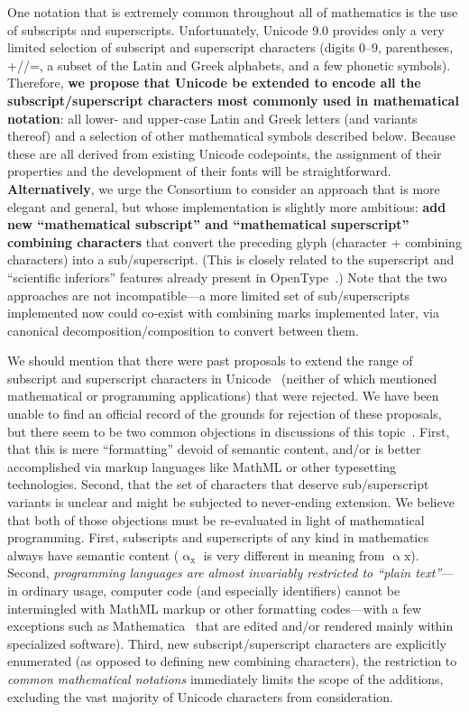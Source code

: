 \documentclass[10pt,english]{article}
\begin{document}
One notation that is extremely common throughout all of mathematics
is the use of subscripts and superscripts. Unfortunately, Unicode
9.0 provides only a very limited selection of subscript and superscript
characters (digits 0--9, parentheses, +/\textendash /=, a subset of
the Latin and Greek alphabets, and a few phonetic symbols). Therefore,\textbf{
we propose that Unicode be extended to encode all the subscript/superscript
characters most commonly used in mathematical notation}: all lower-
and upper-case Latin and Greek letters (and variants thereof) and
a selection of other mathematical symbols described below. Because
these are all derived from existing Unicode codepoints, the assignment
of their properties and the development of their fonts will be straightforward.
\textbf{Alternatively}, we urge the Consortium to consider an approach
that is more elegant and general, but whose implementation is slightly
more ambitious: \textbf{add new ``mathematical subscript'' and ``mathematical
superscript'' combining characters} that convert the preceding glyph
(character + combining characters) into a sub/superscript. (This is
closely related to the superscript and ``scientific
inferiors'' features already present in OpenType~\cite{OpenType}.)
Note that the two approaches are not incompatible---a more limited
set of sub/superscripts implemented now could co-exist with combining
marks implemented later, via canonical decomposition/composition to
convert between them.

We should mention that there were past proposals to extend the range
of subscript and superscript characters in Unicode~\cite{L2-10-230,L2-11-208}
(neither of which mentioned mathematical or programming applications)
that were rejected. We have been unable to find an official record
of the grounds for rejection of these proposals, but there seem to
be two common objections in discussions of this topic~\cite{Miller10,UCDF}.
First, that this is mere ``formatting''
devoid of semantic content, and/or is better accomplished via markup
languages like MathML or other typesetting technologies. Second, that
the set of characters that deserve sub/superscript variants is unclear
and might be subjected to never-ending extension. We believe that
both of those objections must be re-evaluated in light of mathematical
programming. First, subscripts and superscripts of any kind in mathematics
always have semantic content ($\mathrm{{\upalpha_{x}}}$ is very different
in meaning from $\mathrm{\upalpha\mathrm{{x}}}$). Second, \emph{programming
languages are almost invariably restricted to ``plain text''}---in
ordinary usage, computer code (and especially identifiers) cannot
be intermingled with MathML markup or other formatting codes---with
a few exceptions such as Mathematica~\cite{Mathematica} that are
edited and/or rendered mainly within specialized software). Third,
new subscript/superscript characters are explicitly enumerated (as
opposed to defining new combining characters), the restriction to
\emph{common mathematical notations} immediately limits the scope
of the additions, excluding the vast majority of Unicode characters
from consideration.
\end{document}
